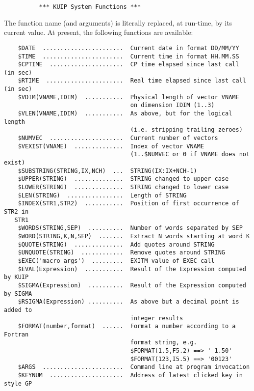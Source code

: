 
\begin{verbatim}
          *** KUIP System Functions ***
\end{verbatim}
\ENDVERB
   \par
The function name (and arguments) is literally replaced, at run-time, by 
   its current value.  At present, the following functions are available:  
\begin{verbatim}
    $DATE  .......................  Current date in format DD/MM/YY
    $TIME  .......................  Current time in format HH.MM.SS
    $CPTIME  .....................  CP time elapsed since last call (in sec)
    $RTIME  ......................  Real time elapsed since last call (in sec)
    $VDIM(VNAME,IDIM)  ...........  Physical length of vector VNAME
                                    on dimension IDIM (1..3)
    $VLEN(VNAME,IDIM)  ...........  As above, but for the logical length
                                    (i.e. stripping trailing zeroes)
    $NUMVEC  .....................  Current number of vectors
    $VEXIST(VNAME)  ..............  Index of vector VNAME
                                    (1..$NUMVEC or 0 if VNAME does not exist)
    $SUBSTRING(STRING,IX,NCH)  ...  STRING(IX:IX+NCH-1)
    $UPPER(STRING)  ..............  STRING changed to upper case
    $LOWER(STRING)  ..............  STRING changed to lower case
    $LEN(STRING)  ................  Length of STRING
    $INDEX(STR1,STR2)  ...........  Position of first occurrence of STR2 in 
   STR1
    $WORDS(STRING,SEP)  ..........  Number of words separated by SEP
    $WORD(STRING,K,N,SEP)  .......  Extract N words starting at word K
    $QUOTE(STRING)  ..............  Add quotes around STRING
    $UNQUOTE(STRING)  ............  Remove quotes around STRING
    $EXEC('macro args')  .........  EXITM value of EXEC call
    $EVAL(Expression)  ...........  Result of the Expression computed by KUIP
    $SIGMA(Expression)  ..........  Result of the Expression computed by SIGMA
    $RSIGMA(Expression) ..........  As above but a decimal point is added to
                                    integer results
    $FORMAT(number,format)  ......  Format a number according to a Fortran
                                    format string, e.g.
                                    $FORMAT(1.5,F5.2) ==> ' 1.50'
                                    $FORMAT(123,I5.5) ==> '00123'
    $ARGS  .......................  Command line at program invocation
    $KEYNUM  .....................  Address of latest clicked key in style GP

\end{verbatim}
